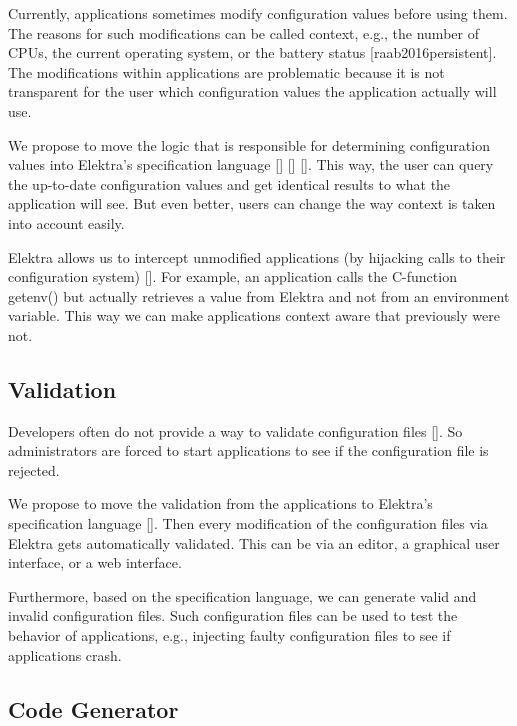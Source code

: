 Currently, applications sometimes modify configuration values before using them. The reasons for such modifications can be called context, e.\+g., the number of C\+P\+Us, the current operating system, or the battery status \mbox{[}raab2016persistent\mbox{]}. The modifications within applications are problematic because it is not transparent for the user which configuration values the application actually will use.

We propose to move the logic that is responsible for determining configuration values into Elektra’s specification language \mbox{[}\mbox{]} \mbox{[}\mbox{]} \mbox{[}\mbox{]}. This way, the user can query the up-\/to-\/date configuration values and get identical results to what the application will see. But even better, users can change the way context is taken into account easily.

Elektra allows us to intercept unmodified applications (by \textquotesingle{}\textquotesingle{}hijacking\textquotesingle{}\textquotesingle{} calls to their configuration system) \mbox{[}\mbox{]}. For example, an application calls the C-\/function getenv() but actually retrieves a value from Elektra and not from an environment variable. This way we can make applications context aware that previously were not.

\subsection*{Validation}

Developers often do not provide a way to validate configuration files \mbox{[}\mbox{]}. So administrators are forced to start applications to see if the configuration file is rejected.

We propose to move the validation from the applications to Elektra’s specification language \mbox{[}\mbox{]}. Then every modification of the configuration files via Elektra gets automatically validated. This can be via an editor, a graphical user interface, or a web interface.

Furthermore, based on the specification language, we can generate valid and invalid configuration files. Such configuration files can be used to test the behavior of applications, e.\+g., injecting faulty configuration files to see if applications crash.

\subsection*{Code Generator}

